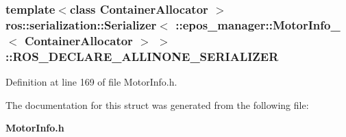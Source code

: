 \subsubsection[{\-R\-O\-S\-\_\-\-D\-E\-C\-L\-A\-R\-E\-\_\-\-A\-L\-L\-I\-N\-O\-N\-E\-\_\-\-S\-E\-R\-I\-A\-L\-I\-Z\-E\-R}]{\setlength{\rightskip}{0pt plus 5cm}template$<$class Container\-Allocator $>$ ros\-::serialization\-::\-Serializer$<$ \-::{\bf epos\-\_\-manager\-::\-Motor\-Info\-\_\-}$<$ \-Container\-Allocator $>$ $>$\-::{\bf \-R\-O\-S\-\_\-\-D\-E\-C\-L\-A\-R\-E\-\_\-\-A\-L\-L\-I\-N\-O\-N\-E\-\_\-\-S\-E\-R\-I\-A\-L\-I\-Z\-E\-R}}\label{structros_1_1serialization_1_1Serializer_3_01_1_1epos__manager_1_1MotorInfo___3_01ContainerAllocator_01_4_01_4_ad6a61f9af5091f6775cdceb7d19f340e}


\-Definition at line 169 of file \-Motor\-Info.\-h.



\-The documentation for this struct was generated from the following file\-:\begin{DoxyCompactItemize}
\item 
{\bf \-Motor\-Info.\-h}\end{DoxyCompactItemize}
